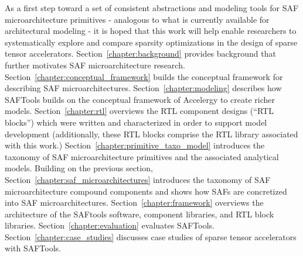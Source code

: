 As a first step toward a set of consistent abstractions and modeling tools for SAF microarchitecture primitives - analogous to what is currently available for architectural modeling - it is hoped that this work will help enable researchers to systematically explore and compare sparsity optimizations in the design of sparse tensor accelerators. Section~\ref{chapter:background} provides background that further motivates SAF microarchitecture research. Section~\ref{chapter:conceptual_framework} builds the conceptual framework for describing SAF microarchitectures. Section~\ref{chapter:modeling} describes how SAFTools builds on the conceptual framework of Accelergy to create richer models. Section~\ref{chapter:rtl} overviews the RTL component designs (``RTL blocks'') which were written and characterized in order to support model development (additionally, these RTL blocks comprise the RTL library associated with this work.) Section~\ref{chapter:primitive_taxo_model} introduces the taxonomy of SAF microarchitecture primitives and the associated analytical models. Building on the previous section, Section~\ref{chapter:saf_microarchitectures} introduces the taxonomy of SAF microarchitecture compound components and shows how SAFs are concretized into SAF microarchitectures. Section~\ref{chapter:framework} overviews the architecture of the SAFtools software, component libraries, and RTL block libraries. Section~\ref{chapter:evaluation} evaluates SAFTools. Section~\ref{chapter:case_studies} discusses case studies of sparse tensor accelerators with SAFTools.

\begin{table}[ht]
\label{tab:thiswork}
\caption{SAFTools and the underlying SAF microarchitecture taxonomy enable fast, accurate SAF microarchitecture modeling based on a consistent set of abstractions.}
\centering
\end{table}